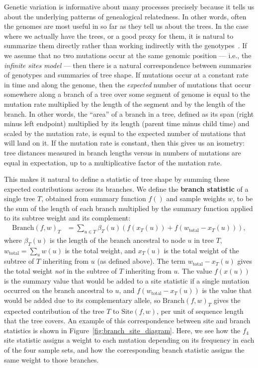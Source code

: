 \documentclass{article}
\newcommand{\branch}{\mbox{Branch}} %
\newcommand{\site}{\mbox{Site}} %
\newcommand{\iw}{w} %
\newcommand{\tiw}{w_\text{total}} %
\newcommand{\nw}{x} %
\begin{document}
Genetic variation is informative about many processes
precisely because it tells us about the underlying patterns of genealogical relatedness.
In other words, often the genomes are most useful in so far as they tell us about the trees.
In the case where we actually have the trees, or a good proxy for them,
it is natural to summarize them directly rather than working indirectly with the
genotypes~\citep{harris2019database}.
If we assume that no two mutations occur at the same genomic position ---
i.e., the \emph{infinite sites model} ---
then there is a natural correspondence between summaries of genotypes and summaries of tree shape.
If mutations occur at a constant rate in time and along the genome,
then the \emph{expected} number of mutations that occur somewhere along a branch of a tree
over some segment of genome
is equal to the mutation rate multiplied by the length of the segment and by the length of the branch.
In other words, the ``area'' of a branch in a tree,
defined as its span (right minus left endpoint) multiplied by its length (parent time minus child time)
and scaled by the mutation rate,
is equal to the expected number of mutations that will land on it.
If the mutation rate is constant,
then this gives us an isometry:
tree distances measured in branch lengths versus in numbers of mutations
are equal in expectation, up to a multiplicative factor of the mutation rate.

This makes it natural to define
a statistic of tree shape by summing these expected contributions across its branches.
We define the \textbf{branch statistic} of a single tree $T$,
obtained from summary function $f()$ and sample weights $\iw$,
to be the sum of the length of each branch
multiplied by the summary function applied to its subtree weight and its complement:
\begin{align}\label{eqn:branch_stat_tree}
    \branch(f, \iw)_T
    &=
    \sum_{u \in T} \beta_{T}(u) \left( f(\nw_{T}(u)) + f(\tiw - \nw_{T}(u)) \right)  ,
\end{align}
where $\beta_{T}(u)$ is the length of the branch ancestral to node $u$ in tree $T$,
$\tiw = \sum_u \iw(u)$ is the total weight,
and $\nw_{T}(u)$ is the total weight of the subtree of $T$ inheriting from $u$ (as defined above).
The term $\tiw - \nw_{T}(u)$ gives the total weight \emph{not} in the subtree of $T$ inheriting from $u$.
The value $f(\nw(u))$ is the summary value that would be added to a site statistic
if a single mutation occurred on the branch ancestral to $u$,
and $f(\tiw - \nw_{T}(u))$ is the value that would be added due to its complementary allele,
so $\branch(f, \iw)_T$ gives the expected contribution of the tree $T$ to $\site(f, \iw)$,
per unit of sequence length that the tree covers.
An example of this correspondence between site and branch statistics
is shown in Figure~\ref{fig:branch_site_diagram}. Here, we
see how the $f_4$ site statistic assigns a weight to each mutation
depending on its frequency in each of the four sample sets,
and how the corresponding branch statistic assigns the same weight to those branches.
\end{document}
